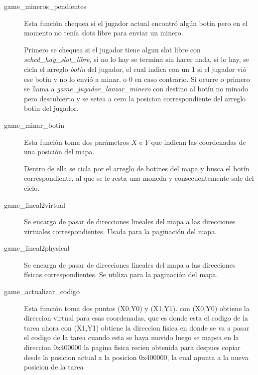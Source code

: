 \begin{description}
\item[game_mineros_pendientes]
  Esta función chequea si el jugador actual encontró algún botín pero en el
  momento no tenía slots libre para enviar un minero.

  Primero se chequea si el jugador tiene algun slot libre con
  {\it sched_hay_slot_libre\/}, si no lo hay se termina sin hacer nada, si lo
  hay, se cicla el arreglo {\it botín\/} del jugador, el cual indica con un 1 si el
  jugador vió ese botin y no lo envió a minar, o 0 en caso contrario. Si ocurre
   o primero se llama a {\it game_jugador_lanzar_minero\/} con destino al botín
   no minado pero descubierto y se setea a cero la posicion correspondiente del
   arreglo botin del jugador.

\item[game_minar_botin]
  Esta función toma dos parámetros $X$ e $Y$ que indican las coordenadas de una
  posición del mapa.

  Dentro de ella se cicla por el arreglo de botines del mapa y busca el botín
  correspondiente, al que se le resta una moneda y consecuentemente sale del
  ciclo.


\item[game_lineal2virtual] Se encarga de pasar de direcciones lineales del mapa
a las direcciones virtuales correspondientes. Usada para la paginación del mapa.

\item[game_lineal2physical] Se encarga de pasar de direcciones lineales del mapa
a las direcciones físicas correspondientes. Se utiliza para la paginación del
mapa.

\item[game_actualizar_codigo] Esta función toma dos puntos (X0,Y0) y (X1,Y1).
  con (X0,Y0) obtiene la direccion virtual para esas coordenadas, que es donde esta el codigo de la tarea ahora
  con (X1,Y1) obtiene la direccion fisica en donde se va a pasar el codigo de la tarea cuando esta se haya movido
  luego se mapea en la direccion 0x400000 la pagina fisica recien obtenida
  para despues copiar desde la posicion actual a la posicion 0x400000, la cual apunta a la nueva posicion de la tarea


\end{description}
